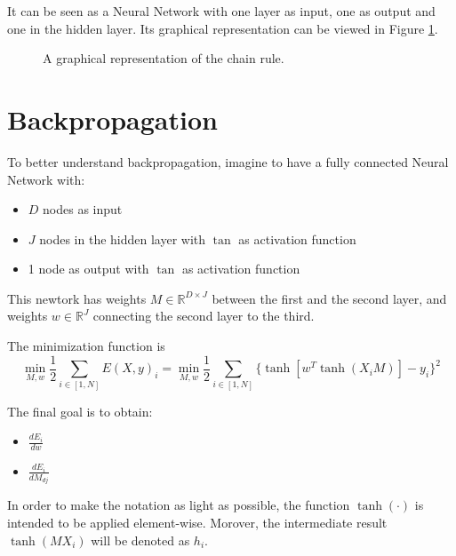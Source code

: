 It can be seen as a Neural Network with one layer as input, one as output and one in the hidden layer.
Its graphical representation can be viewed in Figure \ref{fig:nn-chain}.

\begin{figure}[h]
    \centering
    \caption{A graphical representation of the chain rule.}
    \label{fig:nn-chain}
\end{figure}

\section{Backpropagation}
To better understand backpropagation, imagine to have a fully connected Neural Network with:
\begin{itemize}
    \item $D$ nodes as input
    \item $J$ nodes in the hidden layer with $\tan$ as activation function
    \item 1 node as output with $\tan$ as activation function
\end{itemize}

This newtork has weights $M \in \mathbb{R}^{D \times J}$ between the first and the second layer,
and weights $w \in \mathbb{R}^{J} $ connecting the second layer to the third.

The minimization function is
$$\displaystyle \min_{M, w} \frac{1}{2} \sum_{i \in [1, N]} E(X, y)_i =
    \min_{M, w} \frac{1}{2} \sum_{i \in [1, N]} \{ \tanh[w^T \tanh(X_i M)] - y_i\}^2 $$

The final goal is to obtain:
\begin{multicols}{2}
    \begin{itemize}
        \item $\displaystyle \frac{dE_i}{dw}$
        \item $\displaystyle \frac{dE_i}{dM_{dj}}$
    \end{itemize}
\end{multicols}

In order to make the notation as light as possible, the function $\tanh(\cdot)$ is intended to be applied element-wise.
Morover, the intermediate result $\tanh(M X_i)$ will be denoted as $h_i$.

